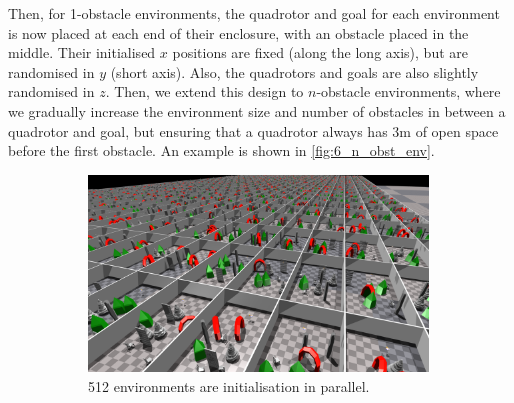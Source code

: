Then, for 1-obstacle environments, the quadrotor and goal for each environment is now placed at each end of their enclosure, with an obstacle placed in the middle. Their initialised $x$ positions are fixed (along the long axis), but are randomised in $y$ (short axis). Also, the quadrotors and goals are also slightly randomised in $z$. Then, we extend this design to $n$-obstacle environments, where we gradually increase the environment size and number of obstacles in between a quadrotor and goal, but ensuring that a quadrotor always has $3$m of open space before the first obstacle. An example is shown in \cref{fig:6_n_obst_env}.
\begin{figure}[hbt]
    \begin{subfigure}[b]{0.69\textwidth}
        \centering
        \includegraphics[width=0.99\textwidth]{figures/6_/6_environments.png}
        \caption{512 environments are initialisation in parallel.\vspace{8mm}}
        \label{fig:6_environments}
    \end{subfigure}
    \hfill
    \begin{subfigure}[b]{0.3\textwidth}
        \centering

\end{subfigure}
\end{figure}
